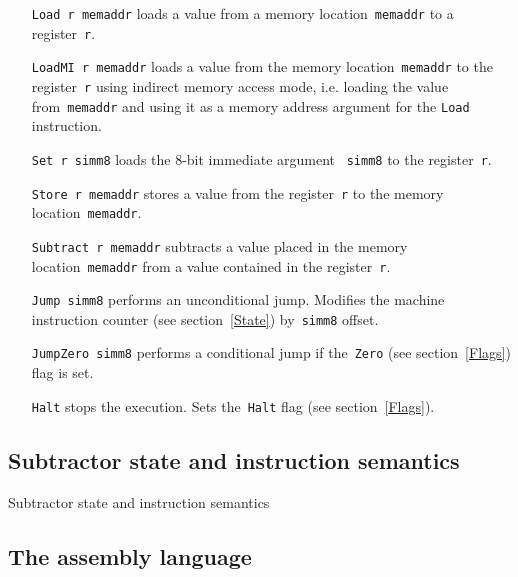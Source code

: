 \begin{itemize}
    \item[\texttt{Load r memaddr}] loads a value from a memory location~\texttt{memaddr} to a register~\texttt{r}.

    \item[\texttt{LoadMI r memaddr}] loads a value from the memory location~\texttt{memaddr} to the register~\texttt{r} using indirect memory access mode, i.e. loading the value from~\texttt{memaddr} and using it as a memory address argument for the \texttt{Load} instruction.

    \item[\texttt{Set r simm8}] loads the 8-bit immediate argument ~\texttt{simm8} to the register~\texttt{r}.

    \item[\texttt{Store r memaddr}] stores a value from the register~\texttt{r} to the memory location~\texttt{memaddr}.

    \item[\texttt{Subtract r memaddr}] subtracts a value placed in the memory location~\texttt{memaddr} from a value contained in the register~\texttt{r}.

    \item[\texttt{Jump simm8}] performs an unconditional jump. Modifies the machine instruction counter (see section~\ref{State}) by~\texttt{simm8} offset.

    \item[\texttt{JumpZero simm8}] performs a conditional jump if the~\texttt{Zero} (see section~\ref{Flags}) flag is set.

    \item[\texttt{Halt}] stops the execution. Sets the~\texttt{Halt} flag (see section~\ref{Flags}).
\end{itemize}

\subsection{Subtractor state and instruction semantics}

Subtractor state and instruction semantics

\subsection{The assembly language}

